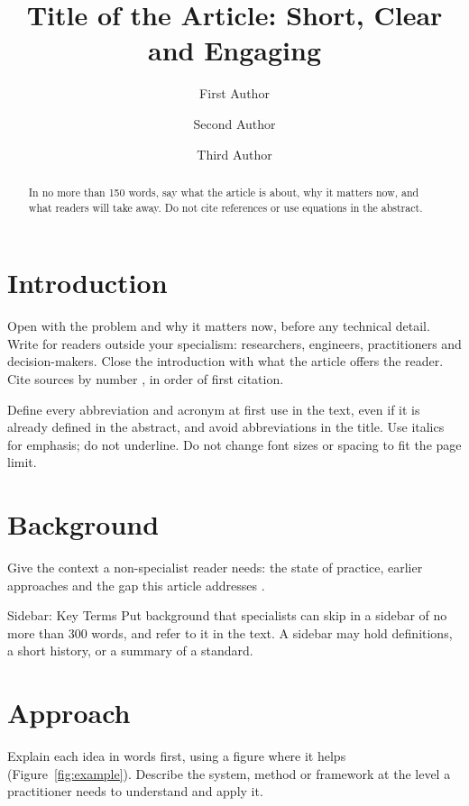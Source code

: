 \documentclass[magazine,anonymous,lineno,{{CITEOPT}}]{nextgeniq}
\title{Title of the Article: Short, Clear and Engaging}
\author[1]{First Author}
\author[2]{Second Author}
\author[1]{Third Author}
\affil[1]{Department, University, City, Country}
\affil[2]{Department, Institution, City, Country}
\begin{document}
\maketitle

\begin{abstract}
In no more than 150 words, say what the article is about, why it matters now,
and what readers will take away. Do not cite references or use equations in
the abstract.
\end{abstract}

\section{Introduction}

Open with the problem and why it matters now, before any technical detail.
Write for readers outside your specialism: researchers, engineers,
practitioners and decision-makers. Close the introduction with what the
article offers the reader. Cite sources by number \citep{smith2024}, in order
of first citation.

Define every abbreviation and acronym at first use in the text, even if it is
already defined in the abstract, and avoid abbreviations in the title. Use
italics for emphasis; do not underline. Do not change font sizes or spacing to
fit the page limit.

\section{Background}

Give the context a non-specialist reader needs: the state of practice, earlier
approaches and the gap this article addresses \citep{lee2023,garcia2022}.

\begin{sidebar}{Sidebar: Key Terms}
Put background that specialists can skip in a sidebar of no more than 300
words, and refer to it in the text. A sidebar may hold definitions, a short
history, or a summary of a standard.
\end{sidebar}

\section{Approach}

Explain each idea in words first, using a figure where it helps
(Figure~\ref{fig:example}). Describe the system, method or framework at the
level a practitioner needs to understand and apply it.
\end{document}
